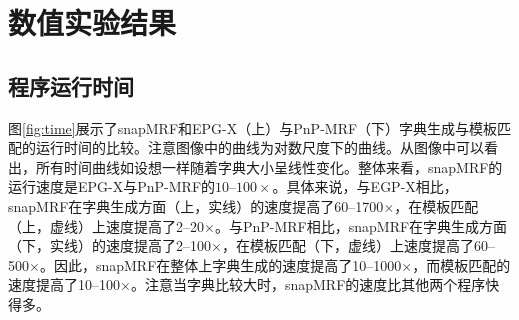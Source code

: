\section{数值实验结果}
\subsection{程序运行时间}
图\ref{fig:time}展示了snapMRF和EPG-X（上）与PnP-MRF（下）字典生成与模板匹配的运行时间的比较。注意图像中的曲线为对数尺度下的曲线。从图像中可以看出，所有时间曲线如设想一样随着字典大小呈线性变化。整体来看，snapMRF的运行速度是EPG-X与PnP-MRF的$10$--$100 \times$。具体来说，与EGP-X相比，snapMRF在字典生成方面（上，实线）的速度提高了60--1700$\times$，在模板匹配（上，虚线）上速度提高了2--20$\times$。与PnP-MRF相比，snapMRF在字典生成方面（下，实线）的速度提高了2--100$\times$，在模板匹配（下，虚线）上速度提高了60--500$\times$。因此，snapMRF在整体上字典生成的速度提高了10--1000$\times$，而模板匹配的速度提高了10--100$\times$。注意当字典比较大时，snapMRF的速度比其他两个程序快得多。

